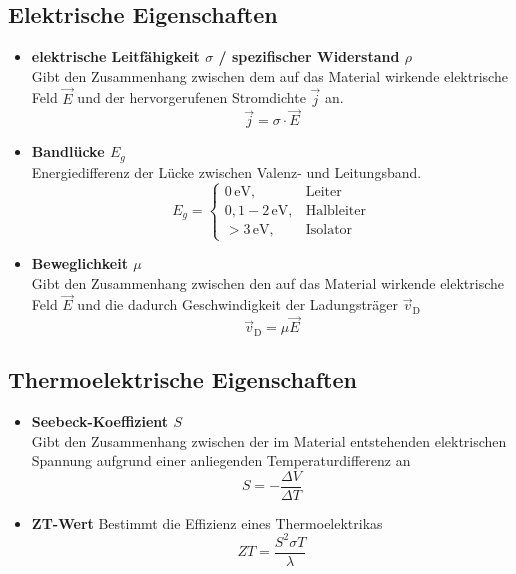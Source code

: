 \documentclass{article}
\begin{document}
\subsection{Elektrische Eigenschaften}
	\begin{itemize}
		\item \textbf{elektrische Leitfähigkeit $\sigma$ / spezifischer Widerstand $\rho$}\\
		Gibt den Zusammenhang zwischen dem auf das Material wirkende elektrische Feld $\vec{E}$ und der hervorgerufenen Stromdichte $\vec{j}$ an.
			\begin{equation}
				\vec{j} = \sigma \cdot \vec{E}
			\end{equation}
		
		
		\item \textbf{Bandlücke $E_g$}\\
		Energiedifferenz der Lücke zwischen Valenz- und Leitungsband.
			\begin{equation}
				E_g =
				\begin{cases}
					0\,\text{eV}, & \text{Leiter} \\
					0,1-2\,\text{eV}, & \text{Halbleiter} \\
					>3\,\text{eV}, & \text{Isolator}
				\end{cases}
			\end{equation}


		\item \textbf{Beweglichkeit $\mu$}\\
		Gibt den Zusammenhang zwischen den auf das Material wirkende elektrische Feld $\vec{E}$ und die dadurch Geschwindigkeit der Ladungsträger $\vec{v}_\text{D}$
			\begin{equation}
				\vec{v}_{\text{D}} = \mu \vec{E}
			\end{equation}
	\end{itemize}


\subsection{Thermoelektrische Eigenschaften}
	\begin{itemize}
		\item \textbf{Seebeck-Koeffizient $S$}\\
		Gibt den Zusammenhang zwischen der im Material entstehenden elektrischen Spannung aufgrund einer anliegenden Temperaturdifferenz an
			\begin{equation}
				S = -\frac{\Delta V}{\Delta T}
			\end{equation}
			
		\item \textbf{ZT-Wert}
		Bestimmt die Effizienz eines Thermoelektrikas
			\begin{equation}
				ZT = \frac{S^2\sigma T}{\lambda}
			\end{equation}
	\end{itemize}
\end{document}
